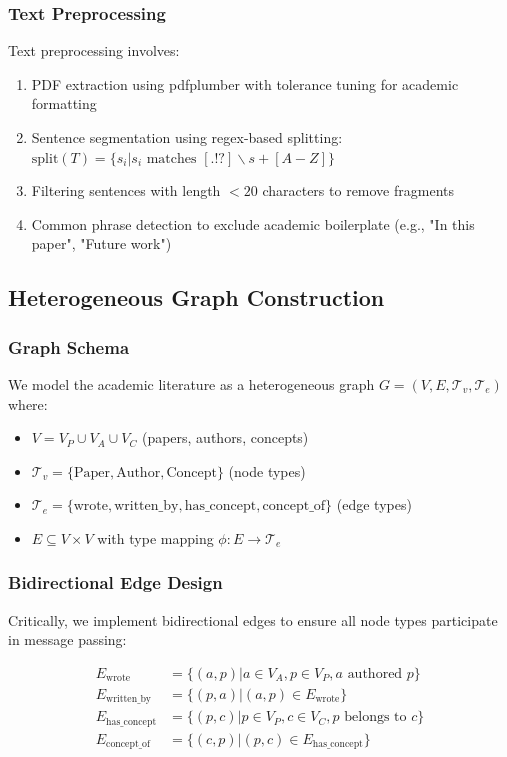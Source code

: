 \documentclass[conference]{IEEEtran}
\begin{document}
\subsubsection{Text Preprocessing}
Text preprocessing involves:
\begin{enumerate}
    \item PDF extraction using pdfplumber with tolerance tuning for academic formatting
    \item Sentence segmentation using regex-based splitting: $\text{split}(T) = \{s_i | s_i \text{ matches } [.!?]\backslash s+[A-Z]\}$
    \item Filtering sentences with length $< 20$ characters to remove fragments
    \item Common phrase detection to exclude academic boilerplate (e.g., "In this paper", "Future work")
\end{enumerate}

\subsection{Heterogeneous Graph Construction}

\subsubsection{Graph Schema}
We model the academic literature as a heterogeneous graph $G = (V, E, \mathcal{T}_v, \mathcal{T}_e)$ where:

\begin{itemize}
    \item $V = V_P \cup V_A \cup V_C$ (papers, authors, concepts)
    \item $\mathcal{T}_v = \{\text{Paper}, \text{Author}, \text{Concept}\}$ (node types)
    \item $\mathcal{T}_e = \{\text{wrote}, \text{written\_by}, \text{has\_concept}, \text{concept\_of}\}$ (edge types)
    \item $E \subseteq V \times V$ with type mapping $\phi: E \rightarrow \mathcal{T}_e$
\end{itemize}

\subsubsection{Bidirectional Edge Design}
Critically, we implement bidirectional edges to ensure all node types participate in message passing:

\begin{align}
E_{\text{wrote}} &= \{(a, p) | a \in V_A, p \in V_P, a \text{ authored } p\} \\
E_{\text{written\_by}} &= \{(p, a) | (a, p) \in E_{\text{wrote}}\} \\
E_{\text{has\_concept}} &= \{(p, c) | p \in V_P, c \in V_C, p \text{ belongs to } c\} \\
E_{\text{concept\_of}} &= \{(c, p) | (p, c) \in E_{\text{has\_concept}}\}
\end{align}
\end{document}
